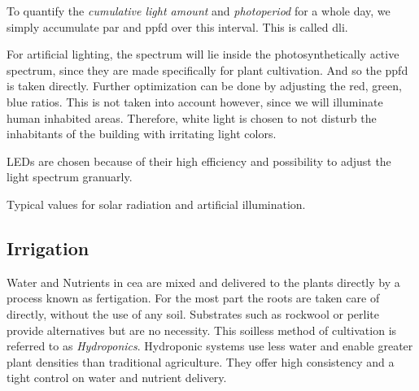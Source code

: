 To quantify the \textit{cumulative light amount} and \textit{photoperiod} for a whole day, we simply accumulate \ac{par} and \ac{ppfd} over this interval.
This is called \ac{dli}.

For artificial lighting, the spectrum will lie inside the photosynthetically active spectrum, since they are made specifically for plant cultivation.
And so the ppfd is taken directly.
Further optimization can be done by adjusting the red, green, blue ratios.
This is not taken into account however, since we will illuminate human inhabited areas.
Therefore, white light is chosen to not disturb the inhabitants of the building with irritating light colors.

LEDs are chosen because of their high efficiency and possibility to adjust the light spectrum granuarly.

Typical values for solar radiation and artificial illumination.



\subsection{Irrigation}
\label{sub:fund-cea-irr}
Water and Nutrients in \ac{cea} are mixed and delivered to the plants directly by a process known as fertigation.
For the most part the roots are taken care of directly, without the use of any soil.
Substrates such as rockwool or perlite provide alternatives but are no necessity.
This soilless method of cultivation is referred to as \textit{Hydroponics}.
Hydroponic systems use less water and enable greater plant densities than traditional agriculture.
They offer high consistency and a tight control on water and nutrient delivery.

